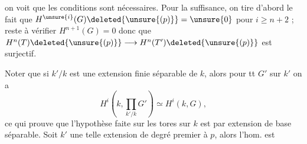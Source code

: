 on voit que les conditions sont nécessaires.
Pour la suffisance, on tire d'abord le fait
que $H^{\unsure{i}}(G)\deleted{\unsure{(p)}}=\unsure{0}$ pour $i\geq n+2$ ; reste
à vérifier $H^{n+1}(G)=0$ donc que
$H^n(T)\deleted{\unsure{(p)}}\longrightarrow H^n(T')\deleted{\unsure{(p)}}$ est surjectif.

Noter que si $k'/k$ est une extension finie
séparable de $k$, alors pour tt $G'$ sur $k'$
on a
\[
H^i(k,\prod_{k'/k}G')\simeq H^i(k,G),
\]
ce qui prouve que l'hypothèse faite sur
les tores sur $k$ est \uline{} par
extension de base séparable. Soit $k'$ une
telle extension de degré premier à $p$, alors
l'hom. 
est  

